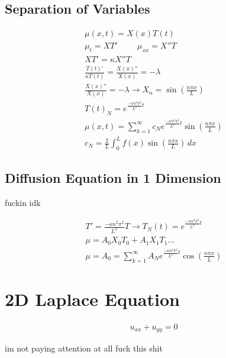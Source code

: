 \documentclass[fleqn]{report}
\newcommand{\hp}{\hspace{1cm}}
\newcommand{\equations} [1] {
\begin{gather*}
#1
\end{gather*}
}
\begin{document}
\subsection{Separation of Variables}
\equations{
\mu(x, t) = X(x) T(t)
\\
\mu_t = XT' \hp \mu_{xx} = X''T 
\\
XT' = \kappa X'' T
\\
\frac{T(t)'}{\kappa T(t)} = \frac{X(x)''}{X(x)} = - \lambda
\\
 \frac{X(x)''}{X(x)} = - \lambda \longrightarrow X_n = \sin (\frac{n \pi x}{L})
 \\
 T(t)_N = e^{\frac{- \kappa n^2 \pi^2}{L^2}t}
 \\
 \mu (x, t) = \sum^\infty_{k = 1} c_N e^{\frac{- \kappa n^2 \pi^2}{L^2}t} \sin( \frac{n \pi x}{L})
 \\
c_N = \frac{2}{L} \int^L_0 f(x) \sin ( \frac{n \pi x}{L}) \, dx
}

\subsection{Diffusion Equation in 1 Dimension}
fuckin idk

\equations{
T' = \frac{- \kappa n^2 \pi^2}{L^2}T
\rightarrow
T_N(t) = e^{ \frac{- \kappa n^2 \pi^2}{L^2}t}
\\
\mu = A_0 X_0 T_0 + A_1 X_1 T_1 \ldots
\\
\mu = A_0 = \sum^\infty_{k = 1} A_N e^{ \frac{- \kappa n^2 \pi^2}{L^2}t} \cos( \frac{n \pi x}{L} )
}

\section{2D Laplace Equation}
\equations{
u_{xx} + u_{yy} = 0
}

im not paying attention at all fuck this shit
\end{document}
